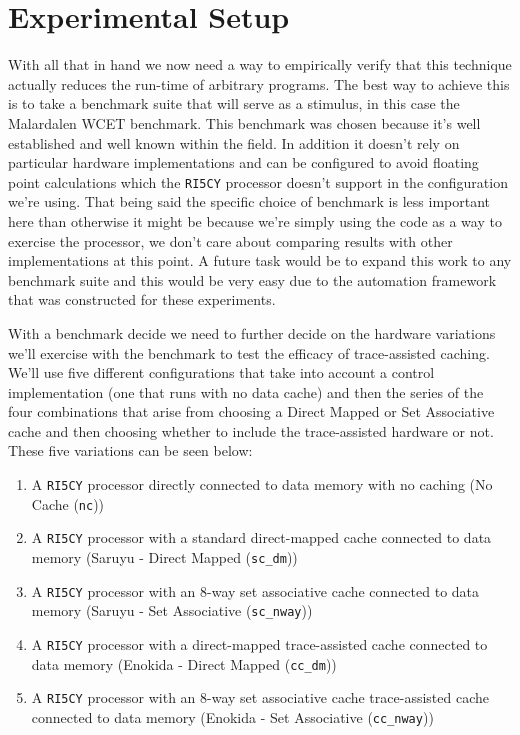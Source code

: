 
\section{Experimental Setup}

With all that in hand we now need a way to empirically verify that this technique actually reduces the run-time of arbitrary programs. The best way to achieve this is to take a benchmark suite that will serve as a stimulus, in this case the Malardalen WCET \cite{gustafssonMalardalenWCETBenchmarks2010} benchmark. This benchmark was chosen because it's well established and well known within the field. In addition it doesn't rely on particular hardware implementations and can be configured to avoid floating point calculations which the \texttt{RI5CY} processor doesn't support in the configuration we're using. That being said the specific choice of benchmark is less important here than otherwise it might be because we're simply using the code as a way to exercise the processor, we don't care about comparing results with other implementations at this point. A future task would be to expand this work to any benchmark suite and this would be very easy due to the automation framework that was constructed for these experiments.

With a benchmark decide we need to further decide on the hardware variations we'll exercise with the benchmark to test the efficacy of trace-assisted caching. We'll use five different configurations that take into account a control implementation (one that runs with no data cache) and then the series of the four combinations that arise from choosing a Direct Mapped or Set Associative cache and then choosing whether to include the trace-assisted hardware or not. These five variations can be seen below:

\begin{enumerate}
	\item A \texttt{RI5CY} processor directly connected to data memory with no caching (No Cache (\texttt{nc}))
	\item A \texttt{RI5CY} processor with a standard direct-mapped cache connected to data memory (Saruyu - Direct Mapped (\texttt{sc\_dm}))
	\item A \texttt{RI5CY} processor with an 8-way set associative cache connected to data memory (Saruyu - Set Associative (\texttt{sc\_nway}))
	\item A \texttt{RI5CY} processor with a direct-mapped trace-assisted cache connected to data memory (Enokida - Direct Mapped (\texttt{cc\_dm}))
	\item A \texttt{RI5CY} processor with an 8-way set associative cache trace-assisted cache connected to data memory (Enokida - Set Associative (\texttt{cc\_nway}))
\end{enumerate}

